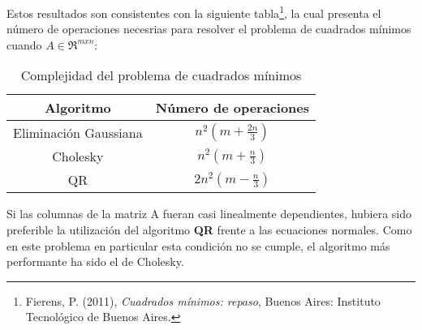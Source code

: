 \documentclass[%
	final,
	reprint,
	notitlepage,
	narroweqnarray,
	inline,
	twoside,
	invited
	]{ieee}
\begin{document}
Estos resultados son consistentes con la siguiente tabla\footnote{Fierens, P. (2011), \emph{Cuadrados mínimos: repaso}, Buenos Aires: Instituto Tecnológico de Buenos Aires.}, la cual presenta el número de operaciones necesrias para resolver el problema de cuadrados mínimos cuando $A \in \Re ^{mxn}$:


\begin{table}[H]
\begin{center}
\begin{tabular}{|c|c|}
\hline
Algoritmo & Número de operaciones\\
\hline
\hline

Eliminación Gaussiana & $n^2(m+\frac{2n}{3})$\\
Cholesky & $n^2(m+\frac{n}{3})$\\
QR & $2n^2(m-\frac{n}{3})$\\

\hline  
\end{tabular}
\end{center}
\caption{Complejidad del problema de cuadrados mínimos}
\label{tmedio}
\end{table}

Si las columnas de la matriz A fueran casi linealmente dependientes, hubiera sido preferible la utilización del algoritmo \textbf{QR} frente a las ecuaciones normales. Como en este problema en particular esta condición no se cumple, el algoritmo más performante ha sido el de Cholesky.


%
%
%
%
%

\clearpage
\end{document}

